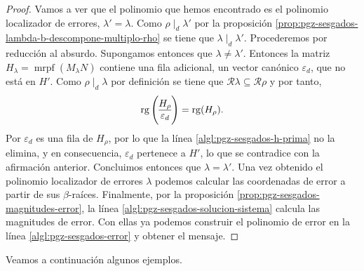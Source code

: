 \begin{proof}
  Vamos a ver que el polinomio que hemos encontrado es el polinomio localizador de errores, \(\lambda' = \lambda\).
  Como \(\rho \mid_d \lambda'\) por la proposición \ref{prop:pgz-sesgados-lambda-b-descompone-multiplo-rho} se tiene que \(\lambda \mid_d \lambda'\).
  Procederemos por reducción al absurdo.
  Supongamos entonces que \(\lambda \neq \lambda'\).
  Entonces la matriz \(H_{\lambda} = \operatorname{mrpf}(M_{\lambda}N)\) contiene una fila adicional, un vector canónico \(\varepsilon_{d}\), que no está en \(H'\).
  Como \(\rho \mid_d \lambda\) por definición se tiene que \(\mathcal R\lambda \subseteq \mathcal R\rho\) y por tanto,
  \[
    \rank\left( \begin{array}{@{}c@{}}
      H_{\rho}\\\hline
      \varepsilon_{d}
    \end{array}\right) = \rank (H_{\rho}).
  \]
  Por \parencite[Lema 2.4]{gomez-torrecillas_petersongorensteinzierler_2018} \(\varepsilon_{d}\) es una fila de \(H_{\rho}\), por lo que la línea \ref{algl:pgz-sesgados-h-prima} no la elimina, y en consecuencia, \(\varepsilon_{d}\) pertenece a \(H'\), lo que se contradice con la afirmación anterior.
  Concluimos entonces que \(\lambda = \lambda'\).
  Una vez obtenido el polinomio localizador de errores \(\lambda\) podemos calcular las coordenadas de error a partir de sus \(\beta\)-raíces.
  Finalmente, por la proposición \ref{prop:pgz-sesgados-magnitudes-error}, la línea \ref{algl:pgz-sesgados-solucion-sistema} calcula las magnitudes de error.
  Con ellas ya podemos construir el polinomio de error en la línea \ref{algl:pgz-sesgados-error} y obtener el mensaje.
\end{proof}

Veamos a continuación algunos ejemplos.

